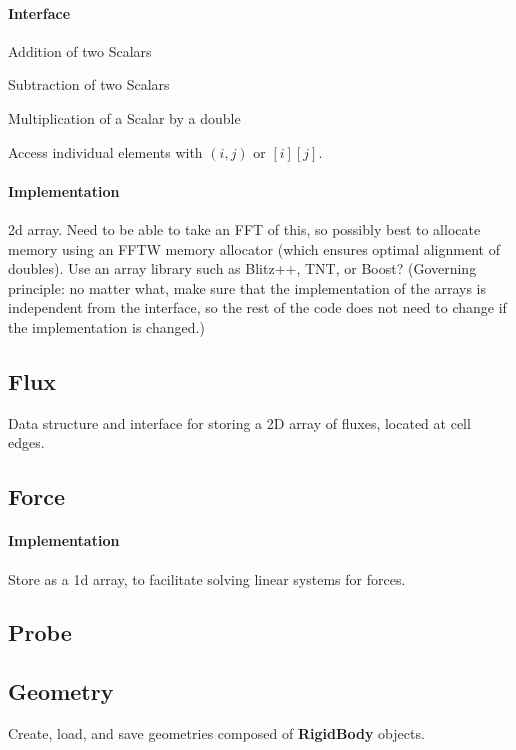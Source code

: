 \documentclass[11pt]{article}
\def\class#1{{\bf #1}} %
\begin{document}
\paragraph{Interface}
\begin{description}
	\item Addition of two Scalars
	\item Subtraction of two Scalars
	\item Multiplication of a Scalar by a double
	\item Access individual elements with $(i,j)$ or $[i][j]$.
\end{description}

\paragraph{Implementation}
2d array.  Need to be able to take an FFT of this, so possibly best to allocate memory using an FFTW memory allocator (which ensures optimal alignment of doubles).  Use an array library such as Blitz++, TNT, or Boost?  (Governing principle: no matter what, make sure that the implementation of the arrays is independent from the interface, so the rest of the code does not need to change if the implementation is changed.)

\subsection{Flux}
Data structure and interface for storing a 2D array of fluxes, located at cell edges.

\subsection{Force}

\paragraph{Implementation}
Store as a 1d array, to facilitate solving linear systems for forces.

\subsection{Probe}
\subsection{Geometry}
Create, load, and save geometries composed of \class{RigidBody} objects.
\end{document}
